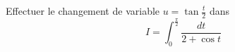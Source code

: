 Effectuer le changement de variable $u=\tan \frac{t}{2}$ dans
\begin{displaymath}
 I=\int_0^{\frac{\pi}{2}}\frac{dt}{2+\cos t}
\end{displaymath}
\bigskip